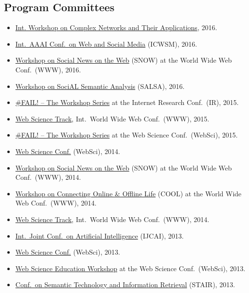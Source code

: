 \documentclass[line,margin]{res}
\begin{document}
\begin{resume}
\section{Program Committees}
\begin{itemize}
\item \href{http://complexnetworks.org/index2016.html}{Int. Workshop on
  Complex Networks and Their Applications}, 2016.  
\item \href{http://www.icwsm.org/2016/index.php}{Int.\ AAAI Conf.\ on
  Web and Social Media} (ICWSM), 2016.
\item \href{http://www.snow-workshop.org/}{Workshop on Social News on
  the Web} (SNOW) at the World Wide Web Conf.\ (WWW), 2016. 
\item \href{http://events.kmi.open.ac.uk/salsa2016/}{Workshop on SociAL
  Semantic Analysis} (SALSA), 2016.
\item \href{https://failworkshops.wordpress.com/fail-at-ir16/}{\#FAIL!
  -- The Workshop Series} at the Internet Research Conf.\ (IR), 2015.
\item \href{http://www.www2015.it/call-for-web-science-track/}{Web
  Science Track}, Int.\ World Wide Web Conf.\ (WWW), 2015.
\item \href{https://failworkshops.wordpress.com/fail-workshop-at-websci15/}{\#FAIL! -- The Workshop Series} at the Web Science Conf.\ (WebSci), 2015.
\item \href{http://www.websci14.org/}{Web Science Conf.} (WebSci),
  2014. 
\item \href{http://www.snow-workshop.org/}{Workshop on Social News on
  the Web} (SNOW) at the World Wide Web Conf.\ (WWW), 2014.
\item \href{http://www.cool2014.com/}{Workshop on Connecting Online \&
  Offline Life} (COOL) at the World Wide Web Conf.\ (WWW), 2014. 
\item \href{http://www2014.kr/calls/call-for-web-science-track/}{Web
  Science Track}, Int.\ World Wide Web Conf.\ (WWW), 2014.
\item \href{http://ijcai13.org/}{Int.\ Joint Conf.\ on Artificial
  Intelligence} (IJCAI), 2013.  
\item \href{http://www.websci13.org/}{Web Science Conf.} (WebSci), 2013. 
\item \href{http://webscience-education-workshop.blogs.usj.edu.lb/}{Web
  Science Education Workshop} at the Web Science Conf.\ (WebSci), 2013. 
\item \href{http://www.ftsm.ukm.my/stair13/}{Conf.\ on Semantic
  Technology and Information Retrieval} (STAIR), 2013. 

\end{itemize}
\end{resume}
\end{document}

